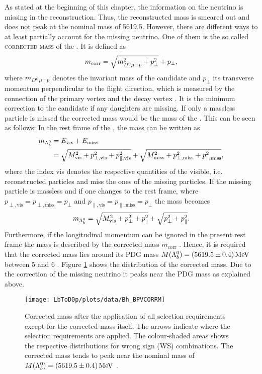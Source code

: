As stated at the beginning of this chapter, the information on the neutrino is missing in the reconstruction.
Thus, the reconstructed \Lb mass is smeared out and does not peak at the nominal \Lb mass of 5619.5\mev.
However, there are different ways to at least partially account for the missing neutrino.
One of them is the so called \textsc{corrected mass} of the \Lb.
It is defined as
\begin{align}
    m_{\text{corr}} = \sqrt{m_{{{D}^0}{\mu^-}{p}}^2 + p_{\perp}^2} + p_{\perp}, \label{eq:correctedMass}
\end{align}
where $m_{{{D}^0}{\mu^-}{p}}$ denotes the invariant mass of the \Dz\mun\proton candidate and $p_\perp$ its transverse momentum perpendicular to the \Lb flight direction, which is measured by the connection of the primary vertex and the \Lb decay vertex \cite{CorrectedMass}.
It is the minimum correction to the \Lb candidate if any daughters are missing.
If only a massless particle is missed the corrected mass would be the mass of the \Lb \cite{HLT2_Topological}.
This can be seen as follows:
In the rest frame of the \Lb, the \Lb mass can be written as
\begin{align}
    m_{{{\Lambda}^0_{b}}} &= E_{\text{vis}} + E_{\text{miss}} \\
            &= \sqrt{M_{\text{vis}}^2 + p_{\perp, \text{vis}}^2 + p_{\parallel, \text{vis}}^2} + \sqrt{M_{\text{miss}}^2 + p_{\perp, \text{miss}}^2 + p_{\parallel, \text{miss}}^2},
\end{align}
where the index vis denotes the respective quantities of the visible, i.e. reconstructed particles and miss the ones of the missing particles.
If the missing particle is massless and if one changes to the \Lb rest frame, where $p_{\perp, \text{vis}} = p_{\perp, \text{miss}} = p_\perp$ and $p_{\parallel, \text{vis}} = p_{\parallel, \text{miss}} = p_\perp$ the \Lb mass becomes
\begin{align}
    m_{{{\Lambda}^0_{b}}} = \sqrt{M_{\text{vis}}^2 + p_{\perp}^2 + p_{\parallel}^2} + \sqrt{p_{\perp}^2 + p_{\parallel}^2}.
\end{align}
Furthermore, if the longitudinal momentum can be ignored in the present rest frame the \Lb mass is described by the corrected mass $m_\text{corr}$ \cite{bQuark_LEP, Kodama:1991ij}.
Hence, it is required that the corrected \Lb mass lies around its PDG mass $M({{\Lambda}^0_{b}})=(5619.5 \pm 0.4)\mathrm{\,Me\kern -0.1em V}$ \cite{PDG} between 5 and 6 \gev.
Figure \ref{fig:plot_correctedMass} shows the distribution of the corrected \Lb mass.
Due to the correction of the missing neutrino it peaks near the PDG mass as explained above.
\begin{figure}[tb]
	\centering
	\texttt{[image: LbToD0p/plots/data/Bh\_BPVCORRM]}
	\caption{Corrected \Lb mass after the application of all selection requirements except for the corrected \Lb mass itself.
             The arrows indicate where the selection requirements are applied.
             The colour-shaded areas shows the respective distributions for wrong sign (WS) combinations.
             The corrected \Lb mass tends to peak near the nominal \Lb mass of $M({{\Lambda}^0_{b}})=(5619.5 \pm 0.4)\mathrm{\,Me\kern -0.1em V}$ \cite{PDG}.}
	\label{fig:plot_correctedMass}
\end{figure}

